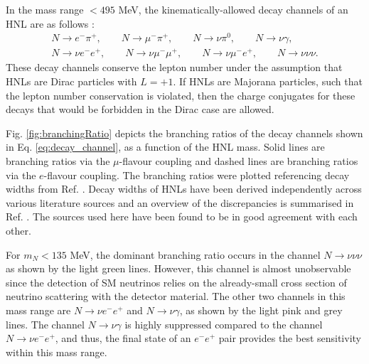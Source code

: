 In the mass range $< 495$ MeV, the kinematically-allowed decay channels of an HNL are as follows \cite{SBNHNL}:
\begin{equation}
\begin{split}
\label{eq:decay_channel}
	N\rightarrow e^{-}\pi^{+},\qquad 
	N\rightarrow \mu^{-}\pi^{+},\qquad
	N\rightarrow \nu \pi^{0},\qquad 
	N\rightarrow \nu \gamma,\qquad \\ 
	N\rightarrow \nu e^{-} e^{+},\qquad 
	N\rightarrow \nu \mu^{-} \mu^{+},\qquad 
	N\rightarrow \nu \mu^{-}e^{+},\qquad
	N\rightarrow \nu \nu \nu.   
\end{split}
\end{equation}
These decay channels conserve the lepton number under the assumption that HNLs are Dirac particles with $L=+1$.
If HNLs are Majorana particles, such that the lepton number conservation is violated, then the charge conjugates for these decays that would be forbidden in the Dirac case are allowed.


Fig. \ref{fig:branchingRatio} depicts the branching ratios of the decay channels shown in Eq. \ref{eq:decay_channel}, as a function of the HNL mass.
Solid lines are branching ratios via the $\mu$-flavour coupling and dashed lines are branching ratios via the $e$-flavour coupling.
The branching ratios were plotted referencing decay widths from Ref. \cite {HNLBin, SBNHNL, HNLZarko}.
Decay widths of HNLs have been derived independently across various literature sources and an overview of the discrepancies is summarised in Ref. \cite{HNLZarko}. 
The sources used here have been found to be in good agreement with each other.

For $m_{N} < 135$ MeV, the dominant branching ratio occurs in the channel $N\rightarrow \nu\nu\nu$ as shown by the light green lines.
However, this channel is almost unobservable since the detection of SM neutrinos relies on the already-small cross section of neutrino scattering with the detector material.
The other two channels in this mass range are $N\rightarrow \nu e^{-}e^{+}$ and $N\rightarrow \nu \gamma$, as shown by the light pink and grey lines.
The channel $N\rightarrow \nu \gamma$ is highly suppressed compared to the channel $N\rightarrow \nu e^{-}e^{+}$, and thus, the final state of an $e^-e^+$ pair provides the best sensitivity within this mass range.

